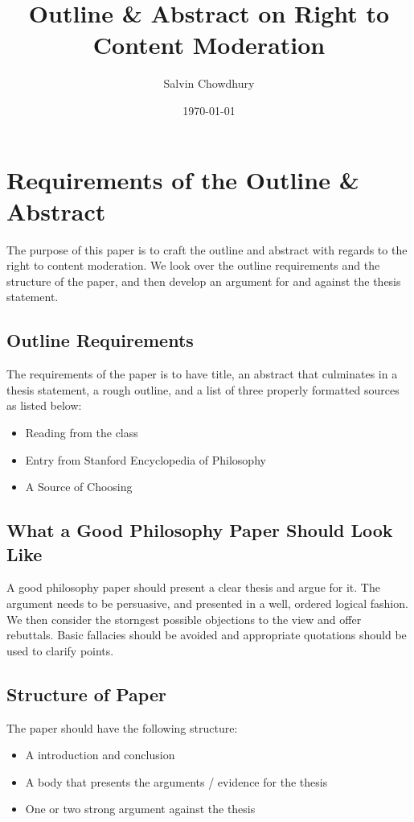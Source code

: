 \documentclass[a4paper]{article}
\title{Outline \& Abstract on Right to Content Moderation}
\author{Salvin Chowdhury}
\date{\today}
\begin{document}
\maketitle

\newpage

\section{Requirements of the Outline \& Abstract}
The purpose of this paper is to craft the outline and abstract with regards to the right to content moderation. We 
look over the outline requirements and the structure of the paper, and then develop an argument for and against the 
thesis statement.

\subsection{Outline Requirements}
The requirements of the paper is to have title, an abstract that culminates in a thesis statement, a rough outline,
and a list of three properly formatted sources as listed below:
\begin{itemize}
    \item Reading from the class
    \item Entry from Stanford Encyclopedia of Philosophy
    \item A Source of Choosing
\end{itemize}

\subsection{What a Good Philosophy Paper Should Look Like}
A good philosophy paper should present a clear thesis and argue for it. The argument needs to be persuasive, and 
presented in a well, ordered logical fashion. We then consider the storngest possible objections to the view and offer
rebuttals. Basic fallacies should be avoided and appropriate quotations should be used to clarify points.

\subsection{Structure of Paper}
The paper should have the following structure:
\begin{itemize}
    \item A introduction and conclusion
    \item A body that presents the arguments / evidence for the thesis
    \item One or two strong argument against the thesis
\end{itemize}
\end{document}
